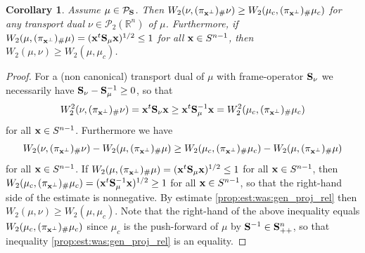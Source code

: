 \documentclass{amsart}
\numberwithin{equation}{section}
\newcommand\cP{{\mathcal P}}
\newcommand\bS{{\bf S}}
\newcommand\R{{\mathbb R}}
\theoremstyle{plain}
\newtheorem{corollary}[subsection]{Corollary}
\theoremstyle{definition}
\begin{document}
\begin{corollary} 
Assume $\mu \in \cP_{\bS}$. Then $W_2(\nu, (\pi_{{\bf x}^{\perp}})_{\#} \nu) \geq  W_2(\mu_c, (\pi_{{\bf x}^{\perp}})_{\#} \mu_c)$ for any transport dual 
$\nu \in \cP_{2}(\R^n)$ of $\mu$. Furthermore, if $W_2(\mu, (\pi_{{\bf x}^{\perp}})_{\#} \mu)=({\bf x}^t\bS_{\mu}{\bf x})^{1/2} \leq 1$
for all ${\bf x} \in S^{n-1}$, then $ W_2(\mu, \nu) \geq  W_2(\mu, \mu_c)$.  


    
\end{corollary}
\begin{proof}
    For a (non canonical) transport dual of $\mu$ with frame-operator $\bS_{\nu}$ we necessarily have $\bS_{\nu}-\bS^{-1}_{\mu} \geq 0$, so that  
\[W^2_2(\nu, (\pi_{{\bf x}^{\perp}})_{\#} \nu)={\bf x }^t\bS_{\nu}{\bf x} \geq {\bf x }^t \bS^{-1}_{\mu} {\bf x} = W^2_2(\mu_c, (\pi_{{\bf x}^{\perp}})_{\#} \mu_c)\]
for all ${\bf x} \in S^{n-1}$. %
Furthermore we have 
\[  W_2(\nu, (\pi_{{\bf x}^{\perp}})_{\#} \nu) - W_2(\mu, (\pi_{{\bf x}^{\perp}})_{\#} \mu) \geq  W_2(\mu_c, (\pi_{{\bf x}^{\perp}})_{\#} \mu_c) -  W_2(\mu, (\pi_{{\bf x}^{\perp}})_{\#} \mu)  \]
for all ${\bf x} \in S^{n-1}$. 
If $W_2(\mu, (\pi_{{\bf x}^{\perp}})_{\#} \mu)=({\bf x}^t\bS_{\mu}{\bf x})^{1/2} \leq 1$
for all ${\bf x} \in S^{n-1}$, then $W_2(\mu_c, (\pi_{{\bf x}^{\perp}})_{\#} \mu_c)=({\bf x}^t\bS^{-1}_{\mu}{\bf x})^{1/2} \geq 1$
for all ${\bf x} \in S^{n-1}$, so that the right-hand side of the estimate is nonnegative. By estimate \ref{prop:est:was:gen_proj_rel} then   
$  W_2(\mu, \nu) \geq  W_2(\mu, \mu_c)$. Note that the right-hand of the above inequality equals $W_2(\mu_c, (\pi_{{\bf x}^{\perp}})_{\#} \mu_c)$ 
since $\mu_c$ is the push-forward of $\mu$ by $\bS^{-1} \in \bS^n_{++}$, so that inequality \ref{prop:est:was:gen_proj_rel} is an equality. 
\end{proof}
\end{document}
